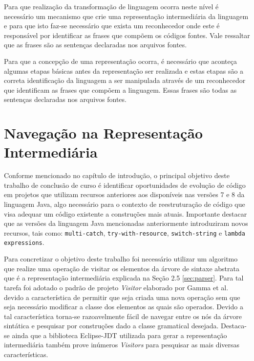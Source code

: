 Para que realização da transformação de linguagem ocorra neste nível é necessário um mecanismo que crie uma representação intermediária da linguagem e para que isto faz-se necessário que exista um reconhecedor onde este é responsável por identificar as frases que compõem os códigos fontes. Vale ressaltar que as frases são as sentenças declaradas nos arquivos fontes.

Para que a concepção de uma representação ocorra, é necessário que aconteça algumas etapas básicas antes da representação ser realizada e estas etapas são a correta identificação da linguagem a ser manipulada através de um reconhecedor que identificam as frases que compõem a linguagem. Essas frases são todas as sentenças declaradas nos arquivos fontes.


\section{Navegação na Representação Intermediária}\label{sec:visitor}
Conforme mencionado no capítulo de introdução, o principal objetivo deste trabalho de conclusão de curso é identificar oportunidades de evolução de código  em projetos que utilizam recursos anteriores aos disponíveis nas versões 7 e 8 da linguagem Java, algo necessário para o contexto de reestruturação de código que visa adequar um código existente a construções mais atuais. Importante destacar que as versões da linguagem Java mencionadas anteriormente introduziram novos recursos, tais como: \texttt{multi-catch}, \texttt{try-with-resource}, \texttt{switch-string} e \texttt{lambda expressions}.

Para concretizar o objetivo deste trabalho foi necessário utilizar um algoritmo que realize uma operação de visitar os elementos da árvore de sintaxe abstrata que é a representação intermediária explicada na Seção 2.5 \ref{sec:parser}. Para tal tarefa foi adotado o padrão de projeto \textit{Visitor} elaborado por Gamma et al.~\cite{Gamma:1995} devido a característica de permitir que seja criada uma nova operação sem que seja necessário modificar a classe dos elementos as quais são operados. Devido a tal característica torna-se razoavelmente fácil de navegar entre os nós da árvore sintática e pesquisar por construções dado a classe gramatical desejada. Destaca-se ainda que a biblioteca Eclipse-JDT utilizada para gerar a representação intermediária também prove inúmeros \textit{Visitors} para pesquisar as mais diversas características.

